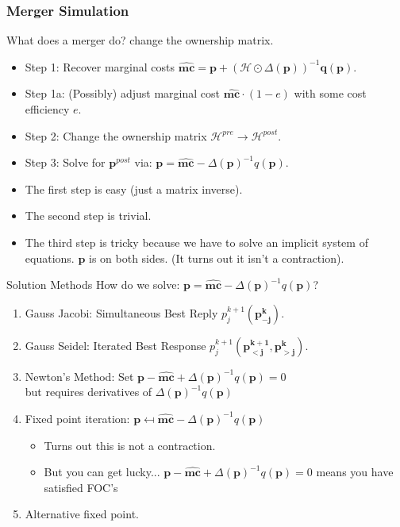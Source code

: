 \documentclass[aspectratio=169,10pt]{beamer}
\begin{document}
\begin{frame}
\frametitle{Merger Simulation}
What does a merger do? \alert{change the ownership matrix}.
\begin{itemize}

\item Step 1: Recover marginal costs $\widehat{\symbf{mc}} = \symbf{p} +(\mathcal{H} \odot \Delta(\symbf{p}))^{-1} \symbf{q}(\symbf{p})$.
\item Step 1a: (Possibly) adjust marginal cost $\widehat{\symbf{mc}}\cdot (1-e)$ with some cost efficiency $e$.
\item Step 2: Change the ownership matrix $\mathcal{H}^{pre} \rightarrow \mathcal{H}^{post}$.
\item Step 3: Solve for $\symbf{p}^{post}$ via: $\symbf{p} = \widehat{\symbf{mc}} - \Delta(\symbf{p})^{-1}q(\symbf{p})$.
\end{itemize}
\pause
\vspace{0.5cm}
\begin{itemize}
\item The first step is easy (just a matrix inverse).
\item The second step is trivial.
\item The third step is tricky because we have to solve an implicit system of equations. $\symbf{p}$ is on both sides. (It turns out it isn't a contraction).
\end{itemize}
\end{frame}



\begin{frame}{Solution Methods}
How do we solve: $\symbf{p} = \widehat{\symbf{mc}} - \Delta(\symbf{p})^{-1}q(\symbf{p})$?
\begin{enumerate}
\item Gauss Jacobi: Simultaneous Best Reply  $p_j^{k+1}(\symbf{p_{-j}^k})$.
\item Gauss Seidel: Iterated Best Response  $p_j^{k+1}(\symbf{p_{<j}^{k+1}},\symbf{p_{>j}^{k}})$.
\item Newton's Method: Set $\symbf{p} - \widehat{\symbf{mc}} + \Delta(\symbf{p})^{-1}q(\symbf{p})=0$\\ but requires derivatives of $\Delta(\symbf{p})^{-1}q(\symbf{p})$
\item Fixed point iteration: $\symbf{p} \mapsfrom \widehat{\symbf{mc}} - \Delta(\symbf{p})^{-1}q(\symbf{p})$
\begin{itemize}
\item Turns out this is \alert{not a contraction}.
\item But you can get lucky... $\symbf{p} - \widehat{\symbf{mc}} + \Delta(\symbf{p})^{-1}q(\symbf{p})=0$ means you have satisfied FOC's
\end{itemize}
\item Alternative fixed point.
\end{enumerate}
\end{frame} 
\end{document}
